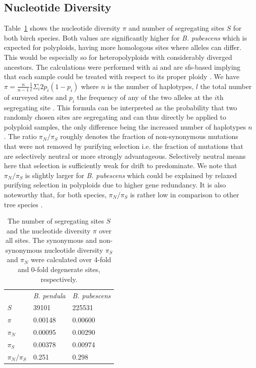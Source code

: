 \documentclass[hidelinks,11pt]{article}
\newcommand{\dadi}{\textdelta a\textdelta i}
\newcommand{\pendula}{\textit{B. pendula}}
\newcommand{\pubescens}{\textit{B. pubescens}}
\begin{document}
{    \subsection{Nucleotide Diversity}
    \label{sec:pi}

    Table~\ref{tbl:pi} shows the nucleotide diversity $\pi$ and number of segregating sites $S$ for both birch species. Both values are significantly higher for \pubescens{} which is expected for polyploids, having more homologous sites where alleles can differ. This would be especially so for heteropolyploids with considerably diverged ancestors. The calculations were performed with \dadi{} and are \acrshort{sfs}-based implying that each sample could be treated with respect to its proper ploidy \cite{dadi}. We have $\pi = \frac{n}{n-1} \frac{1}{l}\Sigma_i 2p_i(1-p_i)$ where $n$ is the number of haplotypes, $l$ the total number of surveyed sites and $p_i$ the frequency of any of the two alleles at the $i$th segregating site \cite{gillespie}. This formula can be interpreted as the probability that two randomly chosen sites are segregating and can thus directly be applied to polyploid samples, the only difference being the increased number of haplotypes $n$ \cite{rick-durrett}. The ratio $\pi_N/\pi_S$ roughly denotes the fraction of non-synonymous mutations that were not removed by purifying selection i.e. the fraction of mutations that are selectively neutral or more strongly advantageous. Selectively neutral means here that selection is sufficiently weak for drift to predominate. We note that $\pi_N/\pi_S$ is slightly larger for \pubescens{} which could be explained by relaxed purifying selection in polyploids due to higher gene redundancy. It is also noteworthy that, for both species, $\pi_N/\pi_S$  is rather low in comparison to other tree species \cite{pi-plants,pi-spruce}.

    \begin{table}[H]
        \begin{center}
            \begin{tabular}{| l | l | l| }
                & \pendula{} & \pubescens{} \\
                $S$           & 39101      & 225531       \\
                $\pi$         & 0.00148    & 0.00600      \\
                $\pi_N$       & 0.00095    & 0.00290      \\
                $\pi_S$       & 0.00378    & 0.00974      \\
                $\pi_N/\pi_S$ & 0.251      & 0.298        \\
            \end{tabular}
        \end{center}
        \caption{The number of segregating sites $S$ and the nucleotide diversity $\pi$ over all sites. The synonymous and non-synonymous nucleotide diversity $\pi_S$ and $\pi_N$ were calculated over 4-fold and 0-fold degenerate sites, respectively.}
        \label{tbl:pi}
    \end{table}

}
\end{document}
